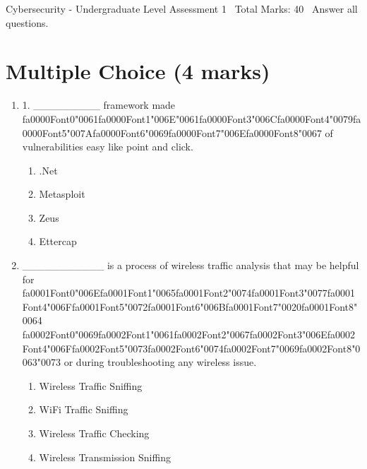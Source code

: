 \documentclass[12pt]{article}
\begin{document}
\begin{center}
Cybersecurity - Undergraduate Level Assessment 1 \
Total Marks: 40 \
Answer all questions.
\end{center}

\section*{Multiple Choice (4 marks)}
\begin{enumerate}[label=\arabic*.]
\item 1. \_\_\_\_\_\_\_\_\_ framework made {\csname fa0000Font0\endcsname\char"0061}{\csname fa0000Font1\endcsname\char"006E}{\char"0061}{\csname fa0000Font3\endcsname\char"006C}{\csname fa0000Font4\endcsname\char"0079}{\csname fa0000Font5\endcsname\char"007A}{\csname fa0000Font6\endcsname\char"0069}{\csname fa0000Font7\endcsname\char"006E}{\csname fa0000Font8\endcsname\char"0067} of vulnerabilities easy like point and click.
\begin{enumerate}[label=(\alph*)]
    \item .Net
    \item Metasploit
    \item Zeus
    \item Ettercap
\end{enumerate}
\item \_\_\_\_\_\_\_\_\_\_\_ is a process of wireless traffic analysis that may be helpful for {\csname fa0001Font0\endcsname\char"006E}{\csname fa0001Font1\endcsname\char"0065}{\csname fa0001Font2\endcsname\char"0074}{\csname fa0001Font3\endcsname\char"0077}{\csname fa0001Font4\endcsname\char"006F}{\csname fa0001Font5\endcsname\char"0072}{\csname fa0001Font6\endcsname\char"006B}{\csname fa0001Font7\endcsname\char"0020}{\csname fa0001Font8\endcsname\char"0064} {\csname fa0002Font0\endcsname\char"0069}{\csname fa0002Font1\endcsname\char"0061}{\csname fa0002Font2\endcsname\char"0067}{\csname fa0002Font3\endcsname\char"006E}{\csname fa0002Font4\endcsname\char"006F}{\csname fa0002Font5\endcsname\char"0073}{\csname fa0002Font6\endcsname\char"0074}{\csname fa0002Font7\endcsname\char"0069}{\csname fa0002Font8\endcsname\char"0063}{\char"0073} or during troubleshooting any wireless issue.
\begin{enumerate}[label=(\alph*)]
    \item Wireless Traffic Sniffing
    \item WiFi Traffic Sniffing
    \item Wireless Traffic Checking
    \item Wireless Transmission Sniffing
\end{enumerate}
\end{enumerate}
\end{document}
